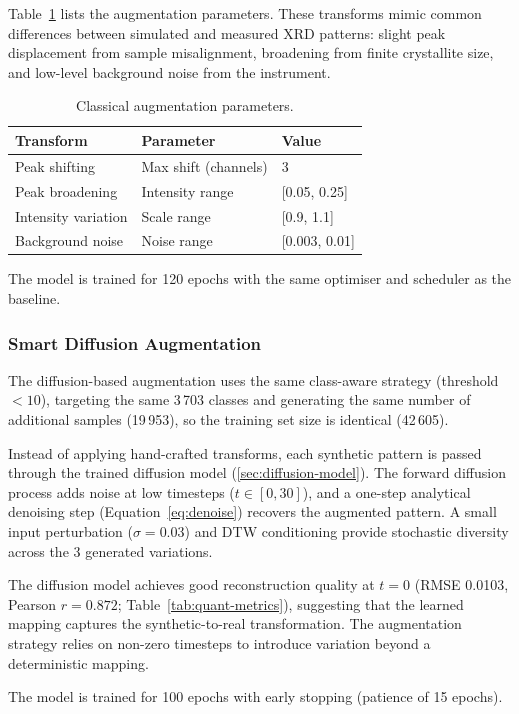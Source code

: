 Table~\ref{tab:classical-aug-params} lists the augmentation parameters.
These transforms mimic common differences between simulated and measured XRD patterns: slight peak displacement from sample misalignment, broadening from finite crystallite size, and low-level background noise from the instrument.

\begin{table}[htbp]
\centering
\caption{Classical augmentation parameters.}
\label{tab:classical-aug-params}
\begin{tabular}{lll}
\toprule
\textbf{Transform} & \textbf{Parameter} & \textbf{Value} \\
\midrule
Peak shifting       & Max shift (channels) & 3 \\
Peak broadening     & Intensity range      & [0.05, 0.25] \\
Intensity variation & Scale range          & [0.9, 1.1] \\
Background noise    & Noise range          & [0.003, 0.01] \\
\bottomrule
\end{tabular}
\end{table}

The model is trained for 120 epochs with the same optimiser and scheduler as the baseline.


\subsubsection{Smart Diffusion Augmentation}

The diffusion-based augmentation uses the same class-aware strategy (threshold $< 10$), targeting the same 3\,703 classes and generating the same number of additional samples (19\,953), so the training set size is identical (42\,605).

Instead of applying hand-crafted transforms, each synthetic pattern is passed through the trained diffusion model (\ref{sec:diffusion-model}).
The forward diffusion process adds noise at low timesteps ($t \in [0, 30]$), and a one-step analytical denoising step (Equation~\ref{eq:denoise}) recovers the augmented pattern.
A small input perturbation ($\sigma{=}0.03$) and DTW conditioning provide stochastic diversity across the 3 generated variations.

The diffusion model achieves good reconstruction quality at $t{=}0$ (RMSE 0.0103, Pearson $r = 0.872$; Table~\ref{tab:quant-metrics}), suggesting that the learned mapping captures the synthetic-to-real transformation.
The augmentation strategy relies on non-zero timesteps to introduce variation beyond a deterministic mapping.

The model is trained for 100 epochs with early stopping (patience of 15 epochs).
